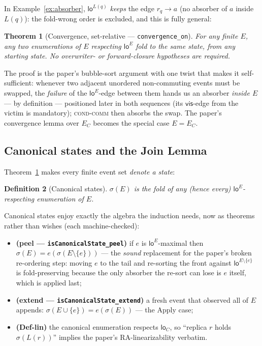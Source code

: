 \documentclass[11pt]{article}
\newtheorem{theorem}{Theorem}[section]
\newtheorem{definition}[theorem]{Definition}
\newcommand{\loE}[1]{\mathsf{lo}^{#1}}
\newcommand{\lean}[1]{\texttt{#1}}
\begin{document}
In Example~\ref{ex:absorber}, $\loE{L(q)}$ \emph{keeps} the edge
$r_q \to a$ (no absorber of $a$ inside $L(q)$): the fold-wrong order is
excluded, and this is fully general:

\begin{theorem}[Convergence, set-relative --- \lean{convergence\_on}]
\label{thm:convon}
For any finite $E$, any two enumerations of $E$ respecting $\loE{E}$ fold
to the same state, from any starting state. \emph{No overwriter- or
forward-closure hypotheses are required.}
\end{theorem}

\noindent The proof is the paper's bubble-sort argument with one twist
that makes it self-sufficient: whenever two adjacent unordered
non-commuting events must be swapped, the \emph{failure} of the
$\loE{E}$-edge between them hands us an absorber \emph{inside $E$} ---
by definition --- positioned later in both sequences (its
$\mathsf{vis}$-edge from the victim is mandatory); \textsc{cond-comm}
then absorbs the swap. The paper's convergence lemma over $E_C$ becomes
the special case $E = E_C$.

\subsection{Canonical states and the Join Lemma}
\label{sec:join}

Theorem~\ref{thm:convon} makes every finite event set \emph{denote a
state}:

\begin{definition}[Canonical states]
$\sigma(E)$ is the fold of any (hence every) $\loE{E}$-respecting
enumeration of $E$.
\end{definition}

Canonical states enjoy exactly the algebra the induction needs, now as
theorems rather than wishes (each machine-checked):
\begin{itemize}[leftmargin=2em]
\item \textbf{(peel --- \lean{isCanonicalState\_peel})} if $e$ is
$\loE{E}$-maximal then $\sigma(E) = e(\sigma(E\setminus\{e\}))$ --- the
\emph{sound} replacement for the paper's broken re-ordering step: moving
$e$ to the tail and re-sorting the front against
$\loE{E\setminus\{e\}}$ is fold-preserving because the only absorber the
re-sort can lose is $e$ itself, which is applied last;
\item \textbf{(extend --- \lean{isCanonicalState\_extend})} a fresh event
that observed all of $E$ appends: $\sigma(E \cup \{e\}) = e(\sigma(E))$
--- the Apply case;
\item \textbf{(Def-lin)} the canonical enumeration respects
$\mathsf{lo}_C$, so ``replica $r$ holds $\sigma(L(r))$'' implies the
paper's RA-linearizability verbatim.
\end{itemize}
\end{document}
